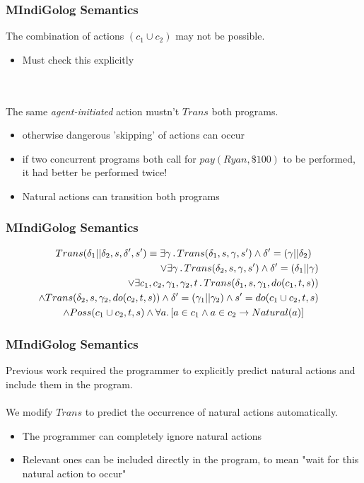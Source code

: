 \documentclass{beamer}
\begin{document}
\begin{frame}
\frametitle{MIndiGolog Semantics}
The combination of actions $(c_1\cup c_2)$ may not be possible.
\begin{itemize}
  \item Must check this explicitly
\end{itemize}
\ \\
\ \\
The same \emph{agent-initiated} action mustn't $Trans$ both programs.
\begin{itemize}
  \item otherwise dangerous 'skipping' of actions can occur
  \item if two concurrent programs both call for $pay(Ryan,\$100)$ to be performed, it had better be performed twice!
  \item Natural actions can transition both programs
\end{itemize}
\end{frame}

\begin{frame}
\frametitle{MIndiGolog Semantics}
\begin{multline*}
Trans(\delta_{1}||\delta_{2},s,\delta',s')\equiv\exists\gamma\,.\, Trans(\delta_{1},s,\gamma,s')\wedge\delta'=(\gamma||\delta_{2})\\
\shoveright{\vee\exists\gamma\,.\, Trans(\delta_{2},s,\gamma,s')\wedge\delta'=(\delta_{1}||\gamma)}\\
\shoveright{\vee\exists c_{1},c_{2},\gamma_{1},\gamma_{2},t\,.\, Trans(\delta_{1},s,\gamma_{1},do(c_{1},t,s))}\\
\shoveright{\wedge Trans(\delta_{2},s,\gamma_{2},do(c_{2},t,s))\wedge\delta'=(\gamma_1||\gamma_2)\wedge s'=do(c_1\cup c_2,t,s)}\\
\wedge Poss(c_1\cup c_2,t,s)\wedge\forall a.\left[a\in c_{1}\wedge a\in c_{2}\rightarrow Natural(a)\right]
\end{multline*}
\end{frame}

\begin{frame}
\frametitle{MIndiGolog Semantics}
Previous work required the programmer to explicitly predict natural actions
and include them in the program.
\ \\
\ \\
We modify $Trans$ to predict the occurrence of natural actions automatically.
\begin{itemize}
  \item The programmer can completely ignore natural actions
  \item Relevant ones can be included directly in the program, to mean "wait for this natural action to occur"
\end{itemize}
\end{frame}
\end{document}
